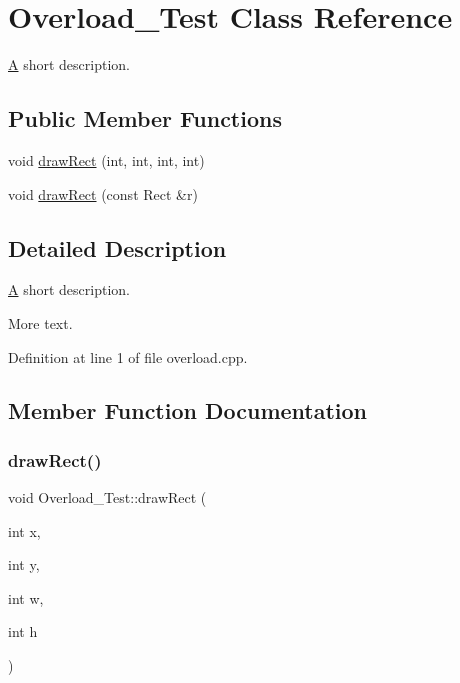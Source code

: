 \hypertarget{class_overload___test}{}\section{Overload\+\_\+\+Test Class Reference}
\label{class_overload___test}


\mbox{\hyperlink{class_a}{A}} short description.  


\subsection*{Public Member Functions}
\begin{DoxyCompactItemize}
\item 
void \mbox{\hyperlink{class_overload___test_a840305784a1944b4de9826a1f4204365}{draw\+Rect}} (int, int, int, int)
\item 
void \mbox{\hyperlink{class_overload___test_a7a613f50092cbc0ef830a818d9f3409c}{draw\+Rect}} (const Rect \&r)
\end{DoxyCompactItemize}


\subsection{Detailed Description}
\mbox{\hyperlink{class_a}{A}} short description. 

More text. 

Definition at line 1 of file overload.\+cpp.



\subsection{Member Function Documentation}
\mbox{\label{class_overload___test_a840305784a1944b4de9826a1f4204365}} 
\subsubsection{\texorpdfstring{drawRect()}{drawRect()}\hspace{0.1cm}{\footnotesize\ttfamily [1/2]}}
{\footnotesize\ttfamily void Overload\+\_\+\+Test\+::draw\+Rect (\begin{DoxyParamCaption}\item[{int}]{x,  }\item[{int}]{y,  }\item[{int}]{w,  }\item[{int}]{h }\end{DoxyParamCaption})}

